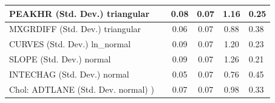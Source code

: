 \begin{table}
\begin{center}
\begin{tabular}{|l|l|c|c|c|l|}
			\hline
			PEAKHR (Std. Dev.) triangular &  & 0.08 & 0.07 & 1.16 & 0.25 \\
			\hline
			MXGRDIFF (Std. Dev.) triangular &  & 0.06 & 0.07 & 0.88 & 0.38 \\
			\hline
			CURVES (Std. Dev.) ln_normal &  & 0.09 & 0.07 & 1.20 & 0.23 \\
			\hline
			SLOPE (Std. Dev.) normal &  & 0.09 & 0.07 & 1.26 & 0.21 \\
			\hline
			INTECHAG (Std. Dev.) normal &  & 0.05 & 0.07 & 0.76 & 0.45 \\
			\hline
			 Chol: ADTLANE (Std. Dev. normal) ) &  & 0.07 & 0.07 & 0.98 & 0.33 \\
			\hline
		\end{tabular}
	\end{center}
\end{table}